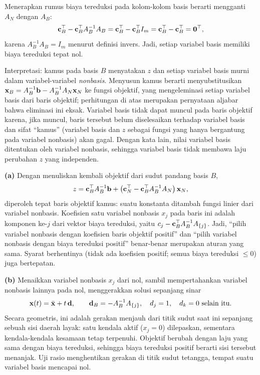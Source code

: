 
Menerapkan rumus biaya tereduksi pada kolom-kolom basis berarti mengganti
$A_N$ dengan $A_B$:
\[
\mathbf{c}_B^\top - \mathbf{c}_B^\top A_B^{-1} A_B
= \mathbf{c}_B^\top - \mathbf{c}_B^\top I_m
= \mathbf{c}_B^\top - \mathbf{c}_B^\top = \mathbf{0}^\top,
\]
karena $A_B^{-1}A_B = I_m$ menurut definisi invers. Jadi, setiap variabel basis
memiliki biaya tereduksi tepat nol.

Interpretasi: kamus pada basis $B$ menyatakan $z$ dan setiap variabel basis
murni dalam variabel-variabel \emph{nonbasis}. Menyusun kamus berarti
menyubstitusikan
$\mathbf{x}_B = A_B^{-1}\mathbf{b} - A_B^{-1}A_N\mathbf{x}_N$ ke fungsi objektif, yang
mengeleminasi setiap variabel basis dari baris objektif; perhitungan di atas
merupakan pernyataan aljabar bahwa eliminasi ini eksak. Variabel basis tidak
dapat muncul pada baris objektif karena, jika muncul, baris tersebut belum
diselesaikan terhadap variabel basis dan sifat ``kamus'' (variabel basis dan
$z$ sebagai fungsi yang hanya bergantung pada variabel nonbasis) akan gagal.
Dengan kata lain, nilai variabel basis ditentukan oleh variabel nonbasis,
sehingga variabel basis tidak membawa laju perubahan $z$ yang independen.


\textbf{(a)} Dengan menuliskan kembali objektif dari sudut pandang basis $B$,
\[
z = \mathbf{c}_B^\top A_B^{-1}\mathbf{b}
+ \left(\mathbf{c}_N^\top - \mathbf{c}_B^\top A_B^{-1} A_N\right)\mathbf{x}_N,
\]
diperoleh tepat baris objektif kamus: suatu konstanta ditambah fungsi linier
dari variabel nonbasis. Koefisien satu variabel nonbasis $x_j$ pada baris ini
adalah komponen ke-$j$ dari vektor biaya tereduksi, yaitu
$c_j - \mathbf{c}_B^\top A_B^{-1} A_{\{j\}}$. Jadi, ``pilih variabel nonbasis dengan
koefisien baris objektif positif'' dan ``pilih variabel nonbasis dengan biaya
tereduksi positif'' benar-benar merupakan aturan yang sama. Syarat berhentinya
(tidak ada koefisien positif; semua biaya tereduksi $\leq 0$) juga bertepatan.

\textbf{(b)} Menaikkan variabel nonbasis $x_j$ dari nol, sambil
mempertahankan variabel nonbasis lainnya pada nol, menggerakkan solusi sepanjang
sinar
\[
\mathbf{x}(t) = \bar{\mathbf{x}} + t\,\mathbf{d},
\qquad
\mathbf{d}_B = -A_B^{-1}A_{\{j\}},\quad d_j = 1,\quad d_k = 0
\mbox{ selain itu}.
\]
Secara geometris, ini adalah gerakan menjauh dari titik sudut saat ini sepanjang
sebuah sisi daerah layak: satu kendala aktif ($x_j = 0$) dilepaskan, sementara
kendala-kendala kesamaan tetap terpenuhi. Objektif berubah dengan laju yang sama
dengan biaya tereduksi, sehingga biaya tereduksi positif berarti sisi tersebut
menanjak. Uji rasio menghentikan gerakan di titik sudut tetangga, tempat suatu
variabel basis mencapai nol.

